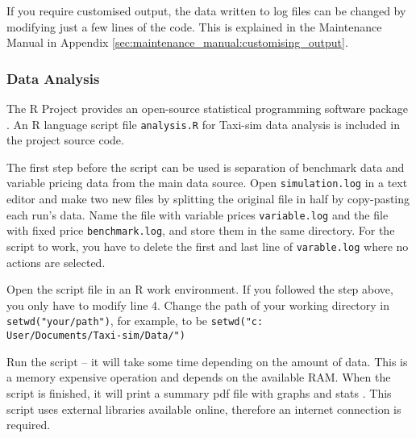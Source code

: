If you require customised output, the data written to log files can be changed
by modifying just a few lines of the code. This is explained in the Maintenance
Manual in Appendix \ref{sec:maintenance_manual:customising_output}.


\subsubsection{Data Analysis}
\label{sec:user_manual:using:data}


The R Project provides an open-source statistical programming software package
\parencite{Rlang}. An R language script file \texttt{analysis.R} for Taxi-sim
data analysis is included in the project source code.

The first step before the script can be used is separation of benchmark data
and variable pricing data from the main data source. Open
\texttt{simulation.log} in a text editor and make two new files by splitting
the original file in half by copy-pasting each run's data. Name the file with
variable prices \texttt{variable.log} and the file with fixed price
\texttt{benchmark.log}, and store them in the same directory. For the script to
work, you have to delete the first and last line of \texttt{varable.log} where
no actions are selected.

Open the script file in an R work environment. If you followed the step above,
you only have to modify line 4. Change the path of your working directory in
\texttt{setwd("your/path")}, for example, to be
\texttt{setwd("c:\\User/Documents/Taxi-sim/Data/")} 

Run the script -- it will take some time depending on the amount of data. This
is a memory expensive operation and depends on the available RAM. When the
script is finished, it will print a summary pdf file with graphs and stats
. This script uses external libraries available online,
therefore an internet connection is required.
